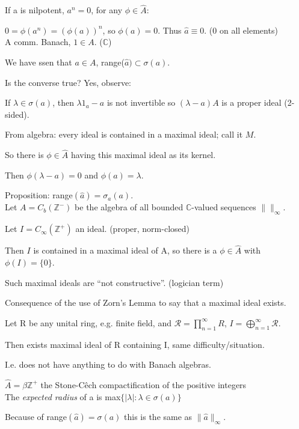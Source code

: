 \documentclass[12pt]{article}
\begin{document}
\noindent
If a is nilpotent, $a^n = 0$, for any $\phi \in \hat{A}$:

$0 = \phi(a^n) = (\phi(a))^n$, so $\phi(a) = 0$.  Thus $\hat{a} \equiv 0$.  (0 on all elements)\\

\noindent
A comm. Banach, $1 \in A$. ($\mathds{C}$)

We have ssen that $a \in A$, range($\hat{a}) \subset \sigma(a)$.

\noindent
Is the converse true? Yes, observe:

If $\lambda \in \sigma(a)$, then $\lambda 1_a - a$ is not invertible so $(\lambda - a)A$ is a proper ideal (2-sided).

From algebra: every ideal is contained in a maximal ideal; call it $M$.

So there is $\phi \in \hat{A}$ having this maximal ideal as its kernel.

Then $\phi(\lambda - a) = 0$ and $\phi(a) = \lambda$.

\noindent
Proposition: range$(\hat{a}) = \sigma_a(a)$.\\

\noindent
Let $A = C_b(\mathds{Z}^-)$ be the algebra of all bounded $\mathds{C}$-valued sequences $\| \|_\infty$.

Let $I = C_\infty(\mathds{Z}^+)$ an ideal. (proper, norm-closed)

Then $I$ is contained in a maximal ideal of A, so there is a $\phi \in \hat{A}$ with $\phi(I) = \{0\}$.

Such maximal ideals are ``not constructive''.  (logician term)

Consequence of the use of Zorn's Lemma to say that a maximal ideal exists.

Let R be any unital ring, e.g. finite field, and $\mathscr{R} = \prod_{n=1}^\infty R$, $I = \bigoplus_{n=1}^\infty \mathscr{R}$.

Then exists maximal ideal of R containing I, same difficulty/situation.

I.e. does not have anything to do with Banach algebras.

$\hat{A} = \beta \mathds{Z}^+$ the Stone-C\^{e}ch compactification of the positive integers\\

\noindent
The \textit{expected radius} of a is max$\{|\lambda|: \lambda \in \sigma(a)\}$

Because of range$(\hat{a}) = \sigma(a)$ this is the same as $\|\hat{a}\|_\infty$.
\end{document}

